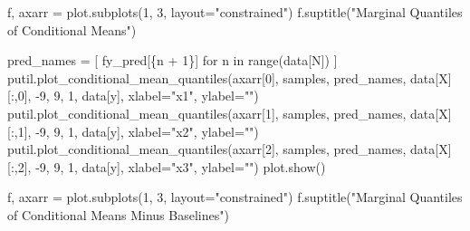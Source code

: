 \documentclass[
  letterpaper,
  DIV=11,
  numbers=noendperiod]{scrartcl}
\newenvironment{Shaded}{\begin{snugshade}}{\end{snugshade}}
\newcommand{\BuiltInTok}[1]{\textcolor[rgb]{0.00,0.23,0.31}{#1}}
\newcommand{\ControlFlowTok}[1]{\textcolor[rgb]{0.00,0.23,0.31}{#1}}
\newcommand{\DecValTok}[1]{\textcolor[rgb]{0.68,0.00,0.00}{#1}}
\newcommand{\KeywordTok}[1]{\textcolor[rgb]{0.00,0.23,0.31}{#1}}
\newcommand{\NormalTok}[1]{\textcolor[rgb]{0.00,0.23,0.31}{#1}}
\newcommand{\OperatorTok}[1]{\textcolor[rgb]{0.37,0.37,0.37}{#1}}
\newcommand{\SpecialCharTok}[1]{\textcolor[rgb]{0.37,0.37,0.37}{#1}}
\newcommand{\SpecialStringTok}[1]{\textcolor[rgb]{0.13,0.47,0.30}{#1}}
\newcommand{\StringTok}[1]{\textcolor[rgb]{0.13,0.47,0.30}{#1}}
\begin{document}
\begin{Shaded}
\begin{Highlighting}[]
\NormalTok{f, axarr }\OperatorTok{=}\NormalTok{ plot.subplots(}\DecValTok{1}\NormalTok{, }\DecValTok{3}\NormalTok{, layout}\OperatorTok{=}\StringTok{"constrained"}\NormalTok{)}
\NormalTok{f.suptitle(}\StringTok{"Marginal Quantiles of Conditional Means"}\NormalTok{)}

\NormalTok{pred\_names }\OperatorTok{=}\NormalTok{ [ }\SpecialStringTok{f\textquotesingle{}y\_pred[}\SpecialCharTok{\{}\NormalTok{n }\OperatorTok{+} \DecValTok{1}\SpecialCharTok{\}}\SpecialStringTok{]\textquotesingle{}} \ControlFlowTok{for}\NormalTok{ n }\KeywordTok{in} \BuiltInTok{range}\NormalTok{(data[}\StringTok{\textquotesingle{}N\textquotesingle{}}\NormalTok{]) ]}
\NormalTok{putil.plot\_conditional\_mean\_quantiles(axarr[}\DecValTok{0}\NormalTok{], samples, pred\_names,}
\NormalTok{                                      data[}\StringTok{\textquotesingle{}X\textquotesingle{}}\NormalTok{][:,}\DecValTok{0}\NormalTok{], }\OperatorTok{{-}}\DecValTok{9}\NormalTok{, }\DecValTok{9}\NormalTok{, }\DecValTok{1}\NormalTok{,}
\NormalTok{                                      data[}\StringTok{\textquotesingle{}y\textquotesingle{}}\NormalTok{], xlabel}\OperatorTok{=}\StringTok{"x1"}\NormalTok{, ylabel}\OperatorTok{=}\StringTok{""}\NormalTok{)}
\NormalTok{putil.plot\_conditional\_mean\_quantiles(axarr[}\DecValTok{1}\NormalTok{], samples, pred\_names,}
\NormalTok{                                      data[}\StringTok{\textquotesingle{}X\textquotesingle{}}\NormalTok{][:,}\DecValTok{1}\NormalTok{], }\OperatorTok{{-}}\DecValTok{9}\NormalTok{, }\DecValTok{9}\NormalTok{, }\DecValTok{1}\NormalTok{,}
\NormalTok{                                      data[}\StringTok{\textquotesingle{}y\textquotesingle{}}\NormalTok{], xlabel}\OperatorTok{=}\StringTok{"x2"}\NormalTok{, ylabel}\OperatorTok{=}\StringTok{""}\NormalTok{)}
\NormalTok{putil.plot\_conditional\_mean\_quantiles(axarr[}\DecValTok{2}\NormalTok{], samples, pred\_names,}
\NormalTok{                                      data[}\StringTok{\textquotesingle{}X\textquotesingle{}}\NormalTok{][:,}\DecValTok{2}\NormalTok{], }\OperatorTok{{-}}\DecValTok{9}\NormalTok{, }\DecValTok{9}\NormalTok{, }\DecValTok{1}\NormalTok{,}
\NormalTok{                                      data[}\StringTok{\textquotesingle{}y\textquotesingle{}}\NormalTok{], xlabel}\OperatorTok{=}\StringTok{"x3"}\NormalTok{, ylabel}\OperatorTok{=}\StringTok{""}\NormalTok{)}
\NormalTok{plot.show()}

\NormalTok{f, axarr }\OperatorTok{=}\NormalTok{ plot.subplots(}\DecValTok{1}\NormalTok{, }\DecValTok{3}\NormalTok{, layout}\OperatorTok{=}\StringTok{"constrained"}\NormalTok{)}
\NormalTok{f.suptitle(}\StringTok{"Marginal Quantiles of Conditional Means Minus Baselines"}\NormalTok{)}


\end{Highlighting}
\end{Shaded}
\end{document}
